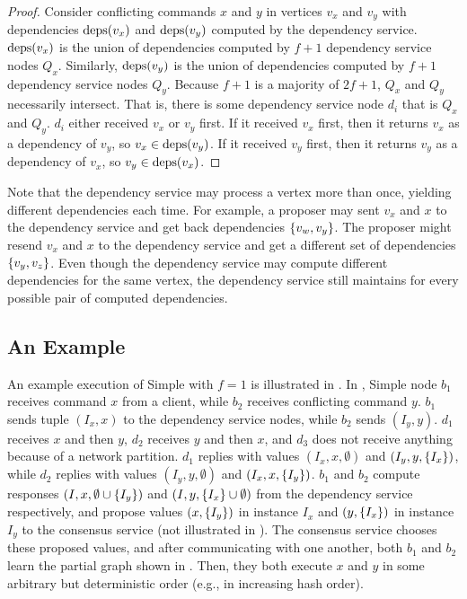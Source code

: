 \begin{proof}
  Consider conflicting commands $x$ and $y$ in vertices $v_x$ and $v_y$ with
  dependencies $\text{deps}(v_x)$ and $\text{deps}(v_y)$ computed by the dependency
  service. $\text{deps}(v_x)$ is the union of dependencies computed by $f+1$
  dependency service nodes $Q_x$. Similarly, $\text{deps}(v_y)$ is the union of
  dependencies computed by $f+1$ dependency service nodes $Q_y$. Because $f+1$
  is a majority of $2f+1$, $Q_x$ and $Q_y$ necessarily intersect. That is,
  there is some dependency service node $d_i$ that is $Q_x$ and $Q_y$.  $d_i$
  either received $v_x$ or $v_y$ first.  If it received $v_x$ first, then it
  returns $v_x$ as a dependency of $v_y$, so $v_x \in \text{deps}(v_y)$.  If it
  received $v_y$ first, then it returns $v_y$ as a dependency of $v_x$, so $v_y
  \in \text{deps}(v_x)$.
\end{proof}

Note that the dependency service may process a vertex more than once, yielding
different dependencies each time. For example, a proposer may sent $v_x$ and
$x$ to the dependency service and get back dependencies $\{v_w, v_y\}$.  The
proposer might resend $v_x$ and $x$ to the dependency service and get a
different set of dependencies $\{v_y, v_z\}$. Even though the dependency
service may compute different dependencies for the same vertex, the dependency
service still maintains  for every possible pair of
computed dependencies.


\subsection{An Example}


An example execution of Simple \BPaxos{} with $f=1$ is illustrated in
. In , Simple \BPaxos{}
node $b_1$ receives command $x$ from a client, while $b_2$ receives conflicting
command $y$. $b_1$ sends tuple $(I_x, x)$ to the dependency service nodes,
while $b_2$ sends $(I_y, y)$. $d_1$ receives $x$ and then $y$, $d_2$ receives
$y$ and then $x$, and $d_3$ does not receive anything because of a network
partition. $d_1$ replies with values $(I_x, x, \emptyset)$ and $(I_y, y,
\{I_x\})$, while $d_2$ replies with values $(I_y, y, \emptyset)$ and $(I_x,
x, \{I_y\})$.  $b_1$ and $b_2$ compute responses $(I, x, \emptyset{} \cup
\{I_y\})$ and $(I, y, \{I_x\} \cup \emptyset{})$ from the dependency
service respectively, and propose values $(x, \{I_y\})$ in instance $I_x$ and
$(y, \{I_x\})$ in instance $I_y$ to the consensus service (not illustrated in
). The consensus service chooses these proposed
values, and after communicating with one another, both $b_1$ and $b_2$ learn
the partial \BPaxos{} graph shown in . Then, they
both execute $x$ and $y$ in some arbitrary but deterministic order (e.g., in
increasing hash order).

